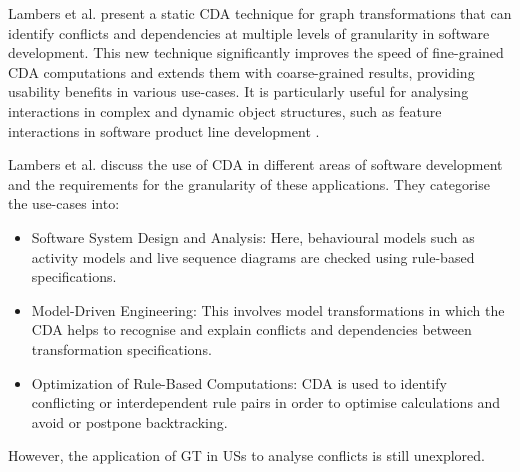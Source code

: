 Lambers et al. present a static CDA technique for graph transformations that can identify conflicts and dependencies at multiple levels of granularity in software development. This new technique significantly improves the speed of fine-grained CDA computations and extends them with coarse-grained results, providing usability benefits in various use-cases. It is particularly useful for analysing interactions in complex and dynamic object structures, such as feature interactions in software product line development \cite{lambers2018multi}.

Lambers et al. discuss the use of CDA in different areas of software development and the requirements for the granularity of these applications. They categorise the use-cases into:
\begin{itemize}
	\item Software System Design and Analysis: Here, behavioural models such as activity models and live sequence diagrams are checked using rule-based specifications. 
	
	\item Model-Driven Engineering: This involves model transformations in which the CDA helps to recognise and explain conflicts and dependencies between transformation specifications.
	
	\item Optimization of Rule-Based Computations: CDA is used to identify conflicting or interdependent rule pairs in order to optimise calculations and avoid or postpone backtracking.
\end{itemize}
However, the application of GT in USs to analyse conflicts is still unexplored.
